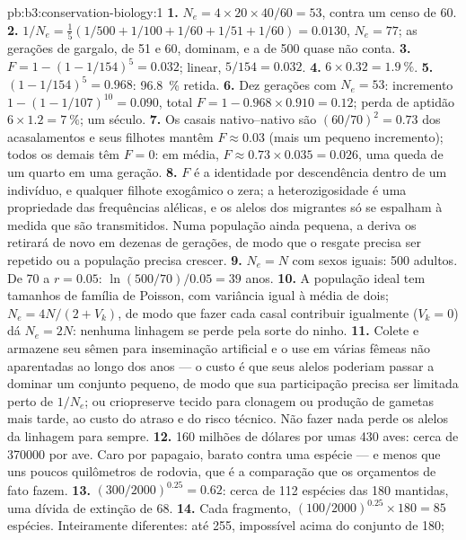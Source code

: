 \begin{solution}{pb:b3:conservation-biology:1}
\textbf{1.} $N_{e} = 4\times 20\times 40/60 = 53$, contra um censo de 60.
\textbf{2.} $1/N_{e} = \tfrac{1}{5}(1/500 + 1/100 + 1/60 + 1/51 + 1/60) =
0.0130$, $N_{e} = 77$; as gerações de gargalo, de 51 e 60, dominam, e a
de 500 quase não conta.
\textbf{3.} $F = 1 - (1 - 1/154)^{5} = 0.032$; linear, $5/154 = 0.032$.
\textbf{4.} $6\times 0.32 = \qty{1.9}{\%}$.
\textbf{5.} $(1 - 1/154)^{5} = 0.968$: \qty{96.8}{\%} retida.
\textbf{6.} Dez gerações com $N_{e} = 53$: incremento $1 - (1 -
1/107)^{10} = 0.090$, total $F = 1 - 0.968\times 0.910 = 0.12$; perda de
aptidão $6\times 1.2 = \qty{7}{\%}$; um século.
\textbf{7.} Os casais nativo--nativo são $(60/70)^{2} = 0.73$ dos
acasalamentos e seus filhotes mantêm $F \approx 0.03$ (mais um pequeno
incremento); todos os demais têm $F = 0$: em média, $F \approx 0.73\times 0.035 = 0.026$, uma queda de um quarto em uma geração.
\textbf{8.} $F$ é a identidade por descendência dentro de um indivíduo, e
qualquer filhote exogâmico o zera; a heterozigosidade é uma propriedade
das frequências alélicas, e os alelos dos migrantes só se espalham à
medida que são transmitidos. Numa população ainda pequena, a deriva os
retirará de novo em dezenas de gerações, de modo que o resgate precisa
ser repetido ou a população precisa crescer.
\textbf{9.} $N_{e} = N$ com sexos iguais: 500 adultos. De 70 a $r =
0.05$: $\ln(500/70)/0.05 = 39$ anos.
\textbf{10.} A população ideal tem tamanhos de família de Poisson, com
variância igual à média de dois; $N_{e} = 4N/(2 + V_{k})$, de modo que
fazer cada casal contribuir igualmente ($V_{k} = 0$) dá $N_{e} = 2N$:
nenhuma linhagem se perde pela sorte do ninho.
\textbf{11.} Colete e armazene seu sêmen para inseminação artificial e o
use em várias fêmeas não aparentadas ao longo dos anos --- o custo é que
seus alelos poderiam passar a dominar um conjunto pequeno, de modo que
sua participação precisa ser limitada perto de $1/N_{e}$; ou
criopreserve tecido para clonagem ou produção de gametas mais tarde, ao
custo do atraso e do risco técnico. Não fazer nada perde os alelos da
linhagem para sempre.
\textbf{12.} \qty{160}{} milhões de dólares por umas 430 aves: cerca de
\num{370000} por ave. Caro por papagaio, barato contra uma espécie --- e
menos que uns poucos quilômetros de rodovia, que é a comparação que os
orçamentos de fato fazem.
\textbf{13.} $(300/2000)^{0.25} = 0.62$: cerca de 112 espécies das 180
mantidas, uma dívida de extinção de 68.
\textbf{14.} Cada fragmento, $(100/2000)^{0.25}\times 180 = 85$ espécies.
Inteiramente diferentes: até 255, impossível acima do conjunto de 180;

\end{solution}

